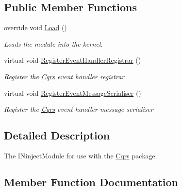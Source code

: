 \subsection*{Public Member Functions}
\begin{DoxyCompactItemize}
\item 
override void \hyperlink{classCqrs_1_1Azure_1_1EventHub_1_1EventBus_1_1Configuration_1_1AzureEventBusReceiverModule_a8cd868f04408a45e25b9fde785dabf7f_a8cd868f04408a45e25b9fde785dabf7f}{Load} ()
\begin{DoxyCompactList}\small\item\em Loads the module into the kernel. \end{DoxyCompactList}\item 
virtual void \hyperlink{classCqrs_1_1Azure_1_1EventHub_1_1EventBus_1_1Configuration_1_1AzureEventBusReceiverModule_ad170174fa51db720544ead9fcd74ecea_ad170174fa51db720544ead9fcd74ecea}{Register\+Event\+Handler\+Registrar} ()
\begin{DoxyCompactList}\small\item\em Register the \hyperlink{namespaceCqrs}{Cqrs} event handler registrar \end{DoxyCompactList}\item 
virtual void \hyperlink{classCqrs_1_1Azure_1_1EventHub_1_1EventBus_1_1Configuration_1_1AzureEventBusReceiverModule_aa66b1894a9647b338a0a3a809c5f270f_aa66b1894a9647b338a0a3a809c5f270f}{Register\+Event\+Message\+Serialiser} ()
\begin{DoxyCompactList}\small\item\em Register the \hyperlink{namespaceCqrs}{Cqrs} event handler message serialiser \end{DoxyCompactList}\end{DoxyCompactItemize}


\subsection{Detailed Description}
The I\+Ninject\+Module for use with the \hyperlink{namespaceCqrs}{Cqrs} package. 



\subsection{Member Function Documentation}
\mbox{\label{classCqrs_1_1Azure_1_1EventHub_1_1EventBus_1_1Configuration_1_1AzureEventBusReceiverModule_a8cd868f04408a45e25b9fde785dabf7f_a8cd868f04408a45e25b9fde785dabf7f}} 
